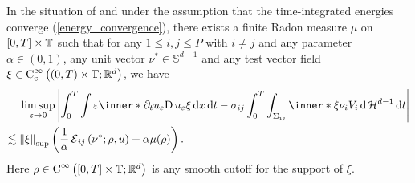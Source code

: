 \begin{proposition}
	\label{convergence_of_velocity_multiphase}
	In the situation of  and under 
	the assumption that the time-integrated energies converge 
	(\ref{energy_convergence}), there exists a finite Radon measure $ \mu $ on 
	$ [ 0 , T ] \times \operatorname{\mathbb{T}} $ such that for any $ 1 \leq i , j \leq P $ 
	with $ i \neq j $ and any parameter $ \alpha \in ( 0 , 1 ) $,  any unit 
	vector $ \nu^{ \ast } \in \mathbb{ S }^{ d - 1 } $ and any test vector 
	field $ \xi \in \operatorname{C}_{ \mathrm{c} }^{ \infty } \left( ( 0 , T ) \times 
	\operatorname{\mathbb{T}} ; \mathbb{ R }^{ d } \right) $, we have
	\begin{align*}
		& \limsup_{ \varepsilon \to 0 }
			\abs{
				\int_{ 0 }^{ T }
					\int
						\varepsilon
						\inner*{ \partial_{ t } u_{ \varepsilon } }{ \diff u_{ 
						\varepsilon } \xi }
					\dd{ x }
				\dd{ t }
				-
				\sigma_{ i j }
				\int_{ 0 }^{ T }
					\int_{ \Sigma_{ i j } }
						\inner*{ \xi }{ \nu_{ i } } V_{ i }
					\dd{ \hm^{ d - 1 } }
				\dd{ t }
			}
		\\
		\lesssim{} &
		\norm{ \xi }_{ \mathrm{sup} }
		\left(
			\frac{ 1 }{ \alpha } \tilt_excess_{ i j } \left( \nu^{ \ast } ; 
			\rho , u \right) 
			+ \alpha \mu ( \rho ) 
		\right).
	\end{align*}
	Here $ \rho \in \operatorname{C}^{ \infty } \left( [ 0 , T ] \times \operatorname{\mathbb{T}} ;  
	\mathbb{ R }^{ d } 
	\right) $ is any 
	smooth cutoff for the support of $ \xi $.
\end{proposition}

